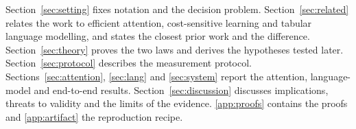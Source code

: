 Section~\ref{sec:setting} fixes notation and the decision problem.
Section~\ref{sec:related} relates the work to efficient attention, cost-sensitive
learning and tabular language modelling, and states the closest prior work and
the difference. Section~\ref{sec:theory} proves the two laws and derives the
hypotheses tested later. Section~\ref{sec:protocol} describes the measurement
protocol. Sections~\ref{sec:attention}, \ref{sec:lang} and \ref{sec:system}
report the attention, language-model and end-to-end results.
Section~\ref{sec:discussion} discusses implications, threats to validity and the
limits of the evidence. \ref{app:proofs} contains the proofs and
\ref{app:artifact} the reproduction recipe.
